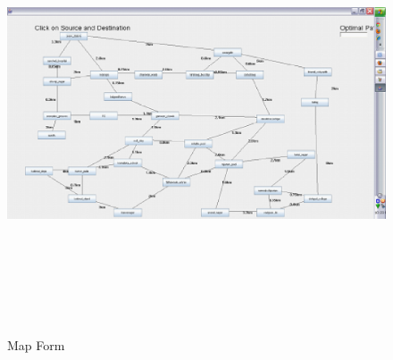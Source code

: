 \begin{center}
\begin{figure}[H]
\includegraphics[width=16cm,height=13cm]{map.eps}
\caption{Map Form}
\end{figure}


\end{center}
